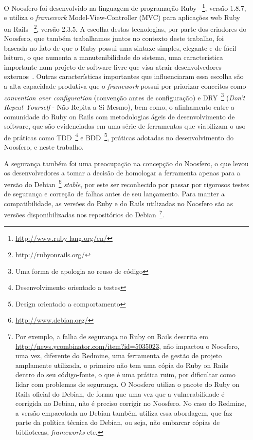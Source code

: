 
O Noosfero foi desenvolvido na linguagem de programação Ruby
~\footnote{\url{http://www.ruby-lang.org/en/}},
versão 1.8.7, e utiliza o \textit{framework} Model-View-Controller (MVC) para aplicações web Ruby on Rails
~\footnote{\url{http://rubyonrails.org/}}, versão 2.3.5.
%
A escolha destas tecnologias, por parte dos criadores do Noosfero, que também
trabalhamos juntos no contexto deste trabalho,
foi baseada no fato de que o Ruby possui uma sintaxe
simples, elegante e de fácil leitura, o que aumenta a manutenibilidade do sistema,
uma característica importante num projeto de software livre que visa atrair
desenvolvedores externos~\cite{meirelles2013}. 
%
Outras características importantes que influenciaram essa escolha são a alta
capacidade produtiva que o \textit{framework} possui por priorizar conceitos como
\textit{convention over configuration} (convenção antes de configuração)
e DRY~\footnote{Uma forma de apologia ao reuso de código}
(\textit{Don't Repeat Yourself} - Não Repita a Si Mesmo), bem como, o alinhamento
entre a comunidade do Ruby on Rails com metodologias ágeis de
desenvolvimento de software, que são evidenciadas em uma série de ferramentas que
viabilizam o uso de práticas como TDD~\footnote{Desenvolvimento orientado a testes}
e BDD~\footnote{Design orientado a comportamento}, práticas adotadas no
desenvolvimento do Noosfero, e neste trabalho.


A segurança também foi uma preocupação na concepção do Noosfero, o que levou os
desenvolvedores a tomar a decisão de homologar a ferramenta apenas para a
versão do Debian~\footnote{\url{http://www.debian.org/}}
\textit{stable}, por este ser reconhecido por passar por rigorosos testes de
segurança e correção de falhas antes de seu lançamento. 
%
Para manter a compatibilidade, as versões do Ruby e do Rails utilizadas no
Noosfero são as versões disponibilizadas nos repositórios do Debian~\footnote{Por exemplo, a falha de segurança no Ruby on Rails descrita em \url{http://news.ycombinator.com/item?id=5035023}, não impactou o Noosfero, uma vez, diferente do Redmine, uma ferramenta de gestão de projeto amplamente utilizada, o primeiro não tem uma cópia do Ruby on Rails dentro do
seu código-fonte, o que é uma prática ruim, por dificultar como lidar com problemas de segurança. O Noosfero utiliza o pacote do Ruby on Rails oficial do Debian, de forma que uma
vez que a vulnerabilidade é corrigida no Debian, não é preciso corrigir no Noosfero. No caso do Redmine, a versão empacotada no Debian também utiliza essa abordagem, que
faz parte da política técnica do Debian, ou seja, não embarcar cópias de bibliotecas, \textit{frameworks} etc.}.

